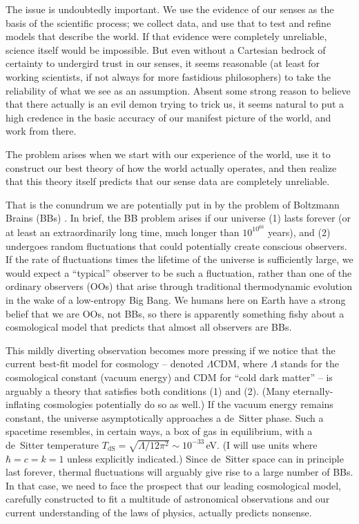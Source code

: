 \documentclass[12pt,letterpaper]{article}
\newcommand{\dS}{{\mathrm{dS}}}
\begin{document}
The issue is undoubtedly important. 
We use the evidence of our senses as the basis of the scientific process; we collect data, and use that to test and refine models that describe the world. 
If that evidence were completely unreliable, science itself would be impossible.
But even without a Cartesian bedrock of certainty to undergird trust in our senses, it seems reasonable (at least for working scientists, if not always for more fastidious philosophers) to take the reliability of what we see as an assumption.
Absent some strong reason to believe that there actually is an evil demon trying to trick us, it seems natural to put a high credence in the basic accuracy of our manifest picture of the world, and work from there.

The problem arises when we start with our experience of the world, use it to construct our best theory of how the world actually operates, and then realize that this theory itself predicts that our sense data are completely unreliable.

That is the conundrum we are potentially put in by the problem of Boltzmann Brains (BBs) \cite{Dyson:2002pf,Albrecht:2004ke,Carroll:2010zz}. 
In brief, the BB problem arises if our universe (1) lasts forever (or at least an extraordinarily long time, much longer than $10^{10^{66}}$ years), and (2) undergoes random fluctuations that could potentially create conscious observers.
If the rate of fluctuations times the lifetime of the universe is sufficiently large, we would expect a ``typical'' observer to be such a fluctuation, rather than one of the ordinary observers (OOs) that arise through traditional thermodynamic evolution in the wake of a low-entropy Big Bang.
We humans here on Earth have a strong belief that we are OOs, not BBs, so there is apparently something fishy about a cosmological model that predicts that almost all observers are BBs.

This mildly diverting observation becomes more pressing if we notice that the current best-fit model for cosmology -- denoted $\Lambda$CDM, where $\Lambda$ stands for the cosmological constant (vacuum energy) and CDM for ``cold dark matter'' -- is arguably a theory that satisfies both conditions (1) and (2).
(Many eternally-inflating cosmologies potentially do so as well.)
If the vacuum energy remains constant, the universe asymptotically approaches a de~Sitter phase.
Such a spacetime resembles, in certain ways, a box of gas in equilibrium, with a de~Sitter temperature $T_\dS = \sqrt{\Lambda/12\pi^2} \sim 10^{-33}$\,eV.
(I will use units where $\hbar=c=k=1$ unless explicitly indicated.)
Since de~Sitter space can in principle last forever, thermal fluctuations will arguably give rise to a large number of BBs.
In that case, we need to face the prospect that our leading cosmological model, carefully constructed to fit a multitude of astronomical observations and our current understanding of the laws of physics, actually predicts nonsense.
\end{document}
